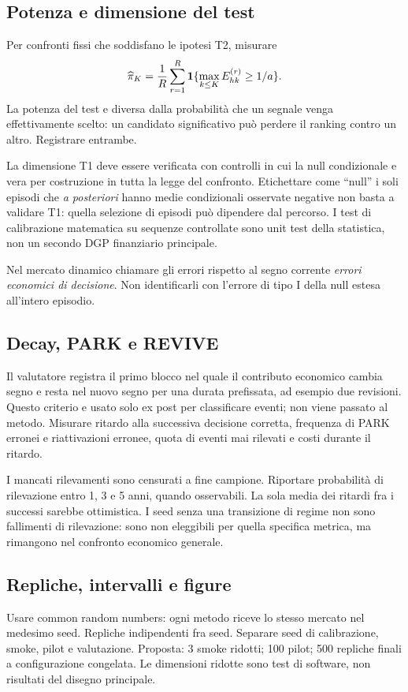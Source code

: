\documentclass[11pt,a4paper]{article}
\theoremstyle{definition}\newtheorem{definition}[theorem]{Definizione}
\theoremstyle{remark}\newtheorem{remark}[theorem]{Osservazione}
\begin{document}
\subsection{Potenza e dimensione del test}
Per confronti fissi che soddisfano le ipotesi T2, misurare
\begin{equation}
 \widehat\pi_K=\frac1R\sum_{r=1}^R
 \mathbf 1\{\max_{k\le K}E^{(r)}_{hk}\ge1/a\}.
\end{equation}
La potenza del test e diversa dalla probabilità che un segnale venga effettivamente scelto: un candidato significativo può perdere il ranking contro un altro. Registrare entrambe.

La dimensione T1 deve essere verificata con controlli in cui la null condizionale e vera per costruzione in tutta la legge del confronto. Etichettare come ``null'' i soli episodi che \emph{a posteriori} hanno medie condizionali osservate negative non basta a validare T1: quella selezione di episodi può dipendere dal percorso. I test di calibrazione matematica su sequenze controllate sono unit test della statistica, non un secondo DGP finanziario principale.

Nel mercato dinamico chiamare gli errori rispetto al segno corrente \emph{errori economici di decisione}. Non identificarli con l'errore di tipo I della null estesa all'intero episodio.

\subsection{Decay, PARK e REVIVE}
Il valutatore registra il primo blocco nel quale il contributo economico cambia segno e resta nel nuovo segno per una durata prefissata, ad esempio due revisioni. Questo criterio e usato solo ex post per classificare eventi; non viene passato al metodo. Misurare ritardo alla successiva decisione corretta, frequenza di PARK erronei e riattivazioni erronee, quota di eventi mai rilevati e costi durante il ritardo.

I mancati rilevamenti sono censurati a fine campione. Riportare probabilità di rilevazione entro 1, 3 e 5 anni, quando osservabili. La sola media dei ritardi fra i successi sarebbe ottimistica. I seed senza una transizione di regime non sono fallimenti di rilevazione: sono non eleggibili per quella specifica metrica, ma rimangono nel confronto economico generale.

\subsection{Repliche, intervalli e figure}
Usare common random numbers: ogni metodo riceve lo stesso mercato nel medesimo seed. Repliche indipendenti fra seed. Separare seed di calibrazione, smoke, pilot e valutazione. Proposta: 3 smoke ridotti; 100 pilot; 500 repliche finali a configurazione congelata. Le dimensioni ridotte sono test di software, non risultati del disegno principale.
\end{document}
